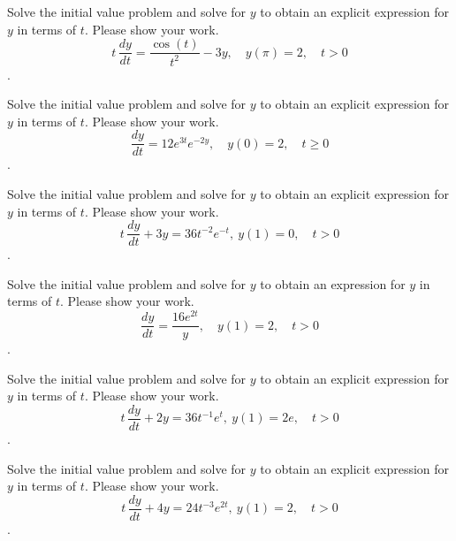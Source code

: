 \newpage 
\ifnum {}  
\question[4] Solve the initial value problem and solve for $y$ to obtain an explicit expression for $y$ in terms of $t$. Please show your work.
$$\displaystyle t\,\frac{dy}{dt} = \frac{\cos(t)}{t^2} - 3y, \quad y(\pi) = 2, \quad t > 0$$.
\fi

\ifnum {}
\question[4] Solve the initial value problem and solve for $y$ to obtain an explicit expression for $y$ in terms of $t$. Please show your work.
$$\displaystyle \frac{dy}{dt} = 12e^{3t}e^{-2y}, \quad y(0) = 2, \quad t \ge 0$$.
\fi

\ifnum {}
\question[4] Solve the initial value problem and solve for $y$ to obtain an explicit expression for $y$ in terms of $t$. Please show your work.
$$\displaystyle t\,\frac{dy}{dt} + 3y =  36 t^{-2}e^{-t}, \ y(1) = 0, \quad t > 0$$.
\fi   

\ifnum {}
\question[4] Solve the initial value problem and solve for $y$ to obtain an expression for $y$ in terms of $t$. Please show your work.
$$\displaystyle \frac{dy}{dt} = \frac{16e^{2t}}{y}, \quad y(1) = 2, \quad t > 0$$.
\fi

\ifnum {}
\question[4] Solve the initial value problem and solve for $y$ to obtain an explicit expression for $y$ in terms of $t$. Please show your work.
$$\displaystyle t\,\frac{dy}{dt} + 2y =  36 t^{-1}e^{t}, \ y(1) = 2e, \quad t > 0$$.
\fi   



\ifnum {}
\question[4] 
Solve the initial value problem and solve for $y$ to obtain an explicit expression for $y$ in terms of $t$. Please show your work.
$$\displaystyle t\,\frac{dy}{dt} + 4y =  24 t^{-3}e^{2t}, \ y(1) = 2, \quad t > 0$$.

